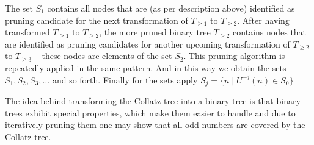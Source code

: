 The set $S_1$ contains all nodes that are (as per description above) identified as pruning candidate for the next transformation of $T_{\ge1}$ to $T_{\ge2}$. After having transformed $T_{\ge1}$ to $T_{\ge2}$, the more pruned binary tree $T_{\ge2}$ contains nodes that are identified as pruning candidates for another upcoming transformation of $T_{\ge2}$ to $T_{\ge3}$ -- these nodes are elements of the set $S_2$. This pruning algorithm is repeatedly applied in the same pattern. And in this way we obtain the sets $S_1,S_2,S_3,\ldots$ and so forth. Finally for the sets apply $S_j=\{n\mid U^{-j}(n)\in S_0\}$

The idea behind transforming the Collatz tree into a binary tree is that binary trees exhibit special properties, which make them easier to handle and due to iteratively pruning them one may show that all odd numbers are covered by the Collatz tree.



